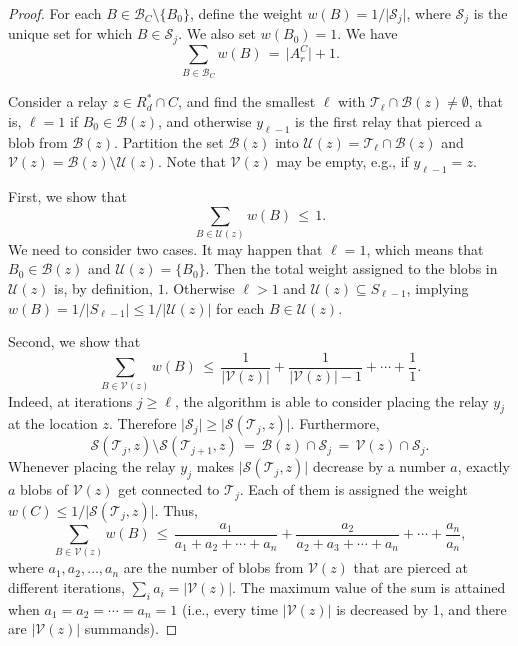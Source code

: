 \documentclass[11pt,a4paper]{article}
\newcommand{\s}[1]{{\lvert #1 \rvert}}
\newcommand{\myB}{\mathcal{B}} \newcommand{\myC}{\mathcal{C}} \newcommand{\myD}{\mathcal{D}} \newcommand{\myP}{\mathcal{P}} \newcommand{\myS}{\mathcal{S}}
\newcommand{\myT}{\mathcal{T}}
\newcommand{\myU}{\mathcal{U}}
\newcommand{\myV}{\mathcal{V}}
\newcommand{\optrel}{R^{*}}
\theoremstyle{definition}
\theoremstyle{remark}
\begin{document}
\begin{proof}
    For each $B \in \myB_C \setminus \{B_0\}$, define the weight $w(B) = 1 / \s{\myS_j}$, where $\myS_j$ is the unique set for which $B \in \myS_j$. We also set $w(B_0) = 1$. We have
    \begin{equation}\label{eq_J+1}
        \sum_{B\in \myB_C} \!\! w(B) \,=\, \s{A_r^C}+1.
    \end{equation}

    Consider a relay $z \in \optrel_d \cap C$, and find the smallest $\ell$ with $\myT_\ell \cap \myB(z) \ne \emptyset$, that is, $\ell = 1$ if $B_0 \in \myB(z)$, and otherwise $y_{\ell-1}$ is the first relay that pierced a blob from $\myB(z)$. Partition the set $\myB(z)$ into $\myU(z) = \myT_\ell \cap \myB(z)$ and $\myV(z) = \myB(z) \setminus \myU(z)$. Note that $\myV(z)$ may be empty, e.g., if $y_{\ell-1}=z$.

    First, we show that
    \[
        {\sum_{B \in \myU(z)} \!\!\! w(B)} \,\le\, 1 .
    \]
    We need to consider two cases. It may happen that $\ell = 1$, which means that $B_0 \in \myB(z)$ and $\myU(z) = \{B_0\}$. Then the total weight assigned to the blobs in $\myU(z)$ is, by definition, $1$. Otherwise $\ell > 1$ and $\myU(z) \subseteq S_{\ell-1}$, implying $ w(B) = 1/\s{S_{\ell-1}} \le 1/{\s{\myU(z)}}$ for each $B \in \myU(z)$.

    Second, we show that
    \[
        {\sum_{B \in \myV(z)} \!\!\! w(B)} \,\le\, \frac{1}{\s{\myV(z)}} + \frac{1}{\s{\myV(z)} - 1} + \dotsb + \frac{1}{1} .
    \]
    Indeed, at iterations $j \ge \ell$, the algorithm is able to consider placing the relay $y_j$ at the location $z$. Therefore $\s{\myS_j} \ge \s{\myS(\myT_j, z)}$. Furthermore,
    \[
        \myS(\myT_j, z) \setminus \myS(\myT_{j+1}, z)
        \,=\, \myB(z)\cap \myS_j
        \,=\, \myV(z) \cap \myS_j .
    \]
    Whenever placing the relay $y_j$ makes $\s{\myS(\myT_j, z)}$ decrease by a number $a$, exactly $a$ blobs of $\myV(z)$ get connected to $\myT_j$. Each of them is assigned the weight $w(C) \le 1/\s{\myS(\myT_j, z)}$.  Thus,
    \[
        \sum_{B \in \myV(z)} w(B)
        \,\le\, \frac{a_1}{a_1+a_2+\dotsb+a_n} + \frac{a_2}{a_2+a_3+\dotsb+a_n} + \dotsb + \frac{a_n}{a_n} ,
    \]
    where $a_1,a_2,\dotsc,a_n$ are the number of blobs from $\myV(z)$ that are pierced at different iterations, $\sum_i a_i = \s{\myV(z)}$.  The maximum value of the sum is attained when $a_1=a_2=\dotsb=a_n=1$ (i.e., every time $\s{\myV(z)}$ is decreased by 1, and there are $\s{\myV(z)}$ summands).


\end{proof}
\end{document}
